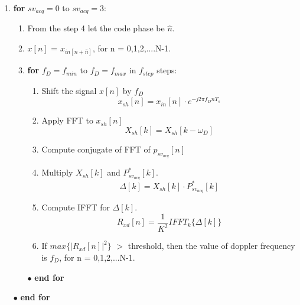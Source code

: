 \documentclass[journal,10pt,onecolumn]{article}
\begin{document}
\begin{enumerate}
    \item \textbf{for} $sv_{acq} = 0$ to $sv_{acq} = 3$:
    \begin{enumerate}
        \item From the step 4 let the code phase be $\hat{n}$.
        \item $x[n]$ = $x_{in[n+\hat{n}]}$, for n = 0,1,2,....N-1.
        \item \textbf{for} $f_D = f_{min}$ to $f_D = f_{max}$ in $f_{step}$ steps:
        \begin{enumerate}
            \item Shift the signal $x[n]$ by $f_D$
            \begin{equation}
                x_{sh}[n] = x_{in}[n]\cdot e ^{-j 2 \pi f_D n T_s} 
            \end{equation}
            \item Apply FFT to $x_{sh}[n]$
            \begin{equation}
                X_{sh}[k] = X_{sh}[k -\omega _D]
            \end{equation}
            \item Compute conjugate of FFT of $p_{sv_{acq}}[n]$ 
        \item Multiply $X_{sh}[k]$ and $P_{sv_{acq}}^*[k ]$.
            \begin{equation}
                \Delta [k] = X_{sh}[k] \cdot P_{sv_{acq}}^*[k]                
            \end{equation}
        \item Compute IFFT for $\Delta[k]$.
            \begin{equation}
                R_{xd}[n] = \frac{1}{K^2} IFFT_k \{\Delta[k] \} 
            \end{equation}
            \item If $max\{\left\lvert R_{xd}[n] \right\rvert^2\}$ $>$ threshold, then the value of doppler frequency is $f_D$, for n = 0,1,2,...N-1.
        \end{enumerate}
        \item[$\bullet$]\textbf{end for}
    \end{enumerate}
    \item[$\bullet$]\textbf{end for}

\end{enumerate}
\end{document}
